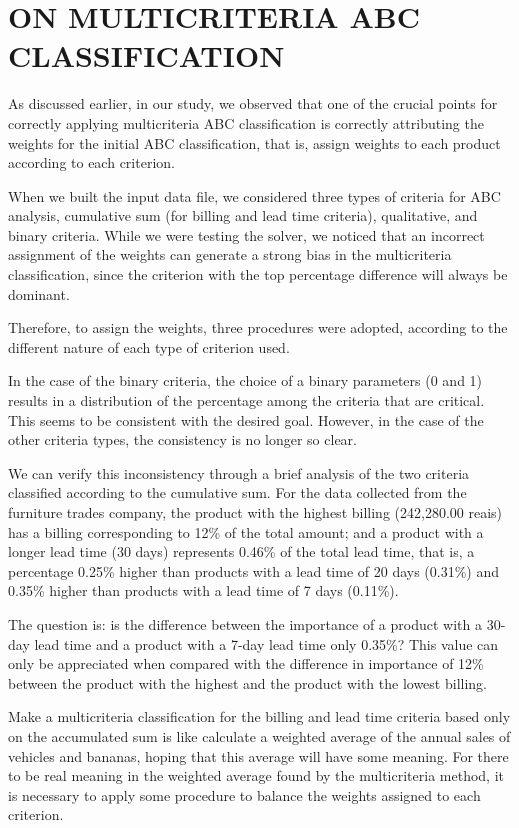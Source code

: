 \documentclass[10pt,fleqn,a4paper,twoside]{article}
\begin{document}
    \section{ON MULTICRITERIA ABC CLASSIFICATION}

As discussed earlier, in our study, we observed that one of the crucial points for correctly applying multicriteria ABC classification is correctly attributing the weights for the initial ABC classification, that is, assign weights to each product according to each criterion.

When we built the input data file, we considered three types of criteria for ABC analysis, cumulative sum (for billing and lead time criteria), qualitative, and binary criteria. While we were testing the solver, we noticed that an incorrect assignment of the weights can generate a strong bias in the multicriteria classification, since the criterion with the top percentage difference will always be dominant.

Therefore, to assign the weights, three procedures were adopted, according to the different nature of each type of criterion used.

In the case of the binary criteria, the choice of a binary parameters (0 and 1) results in a distribution of the percentage among the criteria that are critical. This seems to be consistent with the desired goal. However, in the case of the other criteria types, the consistency is no longer so clear. 

We can verify this inconsistency through a brief analysis of the two criteria classified according to the cumulative sum. For the data collected from the furniture trades company, the product with the highest billing (242,280.00 reais) has a billing corresponding to 12\% of the total amount; and a product with a longer lead time (30 days) represents 0.46\% of the total lead time, that is, a percentage 0.25\% higher than products with a lead time of 20 days (0.31\%) and 0.35\% higher than products with a lead time of 7 days (0.11\%).  

The question is: is the difference between the importance of a product with a 30-day lead time and a product with a 7-day lead time only 0.35\%? This value can only be appreciated when compared with the difference in importance of 12\% between the product with the highest and the product with the lowest billing. 

Make a multicriteria classification for the billing and lead time criteria based only on the accumulated sum is like calculate a weighted average of the annual sales of vehicles and bananas, hoping that this average will have some meaning. For there to be real meaning in the weighted average found by the multicriteria method, it is necessary to apply some procedure to balance the weights assigned to each criterion.
	
\end{document}
